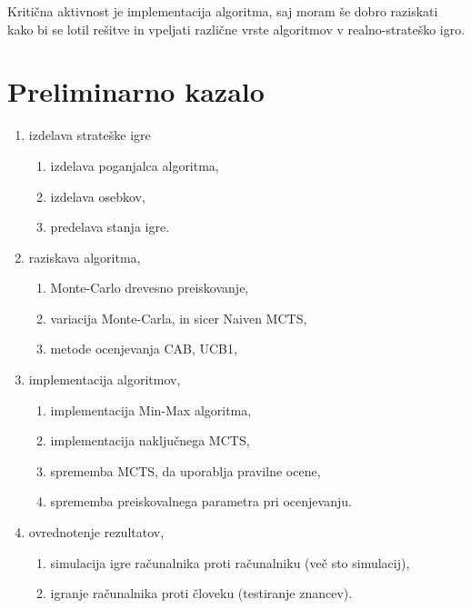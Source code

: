 \documentclass[11pt,a4paper]{article}
\begin{document}
Kritična aktivnost je implementacija algoritma, saj moram še dobro raziskati kako bi se lotil rešitve in vpeljati različne vrste algoritmov v realno-strateško igro. \\





\section{Preliminarno kazalo}
\begin{enumerate}
	\item izdelava strateške igre
	\begin{enumerate}
		\item izdelava poganjalca algoritma,
		\item izdelava osebkov,
		\item predelava stanja igre.
	\end{enumerate}
	\item raziskava algoritma,
	\begin{enumerate}
		\item Monte-Carlo drevesno preiskovanje,
		\item variacija Monte-Carla, in sicer Naiven MCTS,
		\item metode ocenjevanja CAB, UCB1,
	\end{enumerate}
	\item implementacija algoritmov,
	\begin{enumerate}
		\item implementacija Min-Max algoritma,
		\item implementacija naključnega MCTS,
		\item sprememba MCTS, da uporablja pravilne ocene,
		\item sprememba preiskovalnega parametra pri ocenjevanju.
	\end{enumerate}
	\item ovrednotenje rezultatov,
	\begin{enumerate}
		\item simulacija igre računalnika proti računalniku (več sto simulacij),
		\item igranje računalnika proti človeku (testiranje znancev).
	\end{enumerate}
\end{enumerate}
\end{document}
